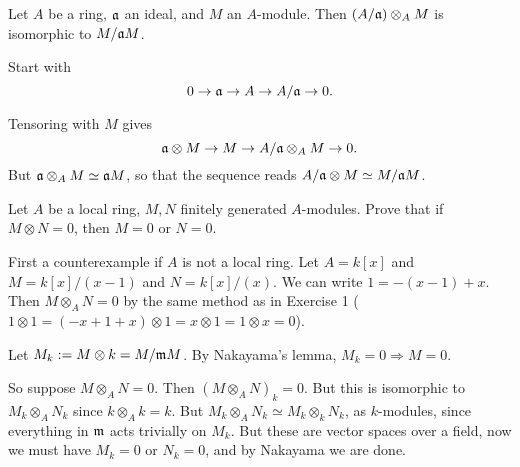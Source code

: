 \documentclass[11pt, english]{article}
\begin{document}
\begin{exc}[Exercise 2]
 Let $A$ be a ring, $\mathfrak{a}$ an ideal, and $M$ an $A$-module. Then $(A/\mathfrak{a}) \otimes_A M$ is isomorphic to $M/\mathfrak{a} M$.
\end{exc}
\begin{sol}
Start with
\[
0 \to \mathfrak{a} \to A \to A/ \mathfrak{a} \to 0.
\]

Tensoring with $M$ gives
\[
\mathfrak{a} \otimes M  \to M \to A/\mathfrak{a} \otimes_A M \to 0.
\]
But $\mathfrak{a} \otimes_A M \simeq \mathfrak{a} M$, so that the sequence reads $A/\mathfrak{a} \otimes M \simeq M/\mathfrak{a} M$.
\end{sol}

\begin{exc}[Exercise 3]
 Let $A$ be a local ring, $M,N$ finitely generated $A$-modules. Prove that if $M \otimes N=0$, then $M=0$ or $N = 0$. 
\end{exc}
\begin{sol}
First a counterexample if $A$ is not a local ring. Let $A=k[x]$ and $M=k[x]/(x-1)$ and $N=k[x]/(x)$. We can write $1 = -(x-1) + x$. Then $M \otimes_A N = 0$ by the same method as in Exercise 1 ($1 \otimes 1 = (-x+1 + x) \otimes 1 = x \otimes 1 = 1 \otimes x = 0$). 

Let $M_k := M \otimes k = M/\mathfrak{m} M$. By Nakayama's lemma, $M_k=0 \Rightarrow M=0$.

So suppose $M \otimes_A N=0$. Then $(M \otimes_A N)_k = 0$. But this is isomorphic to $M_k \otimes_A  N_k$ since $k \otimes_A k = k$. But $M_k \otimes_A N_k \simeq M_k \otimes_k N_k$, as $k$-modules, since everything in $\mathfrak{m}$ acts trivially on $M_k$. But these are vector spaces over a field, now we must have $M_k=0$ or $N_k=0$, and by Nakayama we are done.
\end{sol}
\end{document}
